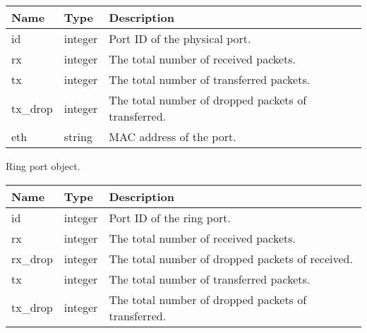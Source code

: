 \documentclass[a4paper,11pt,openany,oneside,english]{sphinxmanual}
\begin{document}
\begin{savenotes}\sphinxattablestart
\centering
{}
\sphinxthecaptionisattop
{}\label{\detokenize{api_ref/spp_primary:id22}}\label{\detokenize{api_ref/spp_primary:table-spp-ctl-primary-status-phy}}
\sphinxaftertopcaption
\begin{tabulary}{\linewidth}[t]{|T|T|T|}
\hline
\sphinxstyletheadfamily 
Name
&\sphinxstyletheadfamily 
Type
&\sphinxstyletheadfamily 
Description
\\
\hline
id
&
integer
&
Port ID of the physical port.
\\
\hline
rx
&
integer
&
The total number of received packets.
\\
\hline
tx
&
integer
&
The total number of transferred packets.
\\
\hline
tx\_drop
&
integer
&
The total number of dropped packets of transferred.
\\
\hline
eth
&
string
&
MAC address of the port.
\\
\hline
\end{tabulary}
\par
\sphinxattableend\end{savenotes}

Ring port object.


\begin{savenotes}\sphinxattablestart
\centering
{}
\sphinxthecaptionisattop
{}\label{\detokenize{api_ref/spp_primary:id23}}\label{\detokenize{api_ref/spp_primary:table-spp-ctl-primary-status-ring}}
\sphinxaftertopcaption
\begin{tabulary}{\linewidth}[t]{|T|T|T|}
\hline
\sphinxstyletheadfamily 
Name
&\sphinxstyletheadfamily 
Type
&\sphinxstyletheadfamily 
Description
\\
\hline
id
&
integer
&
Port ID of the ring port.
\\
\hline
rx
&
integer
&
The total number of received packets.
\\
\hline
rx\_drop
&
integer
&
The total number of dropped packets of received.
\\
\hline
tx
&
integer
&
The total number of transferred packets.
\\
\hline
tx\_drop
&
integer
&
The total number of dropped packets of transferred.
\\
\hline
\end{tabulary}
\par
\sphinxattableend\end{savenotes}
\end{document}
